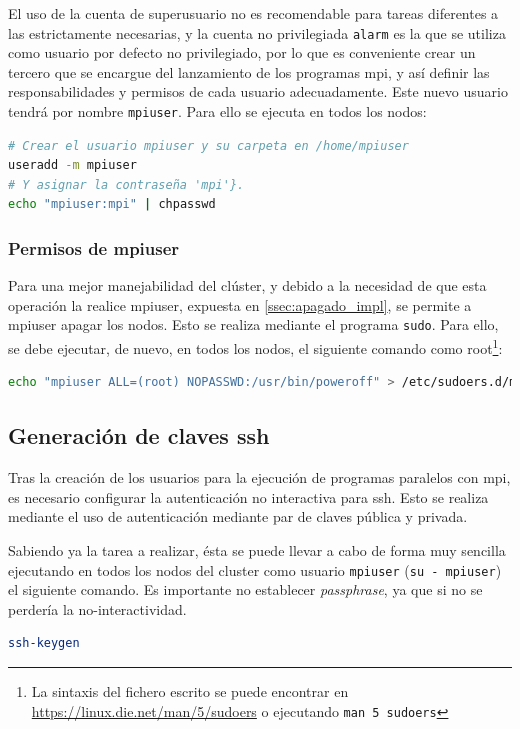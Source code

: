 El uso de la cuenta de superusuario no es recomendable para tareas diferentes a las estrictamente necesarias, y la cuenta no privilegiada \texttt{alarm} es la que se utiliza como usuario por defecto no privilegiado, por lo que es conveniente crear un tercero que se encargue del lanzamiento de los programas \acrshort{mpi}, y así definir las responsabilidades y permisos de cada usuario adecuadamente. Este nuevo usuario tendrá por nombre \texttt{mpiuser}. Para ello se ejecuta en todos los nodos:

\begin{lstlisting}[language=bash]
# Crear el usuario mpiuser y su carpeta en /home/mpiuser
useradd -m mpiuser
# Y asignar la contraseña 'mpi'}.
echo "mpiuser:mpi" | chpasswd
\end{lstlisting}

\subsubsection{Permisos de mpiuser}
Para una mejor manejabilidad del clúster, y debido a la necesidad de que esta operación la realice mpiuser, expuesta en \ref{ssec:apagado_impl}, se permite a mpiuser apagar los nodos. Esto se realiza mediante el programa \texttt{sudo}. Para ello, se debe ejecutar, de nuevo, en todos los nodos, el siguiente comando como root\footnote{La sintaxis del fichero escrito se puede encontrar en \url{https://linux.die.net/man/5/sudoers} o ejecutando \texttt{man 5 sudoers}}:

\begin{lstlisting}[language=bash]
echo "mpiuser ALL=(root) NOPASSWD:/usr/bin/poweroff" > /etc/sudoers.d/mpiuser_poweroff
\end{lstlisting}

\subsection{Generación de claves \acrshort{ssh}}
\label{ssec:gen_ssh}
Tras la creación de los usuarios para la ejecución de programas paralelos con \acrshort{mpi}, es necesario configurar la autenticación no interactiva para \acrshort{ssh}. Esto se realiza mediante el uso de autenticación mediante par de claves pública y privada.

Sabiendo ya la tarea a realizar, ésta se puede llevar a cabo de forma muy sencilla ejecutando en todos los nodos del cluster como usuario \texttt{mpiuser} (\texttt{su - mpiuser}) el siguiente comando. Es importante no establecer \textit{passphrase}, ya que si no se perdería la no-interactividad.
\begin{lstlisting}[language=bash]
ssh-keygen
\end{lstlisting}

